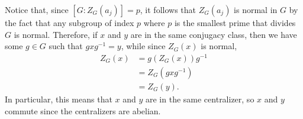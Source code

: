 \documentclass[10pt]{mypackage}
\begin{document}
\begin{solution}
\begin{enumerate}[(a)]
      Notice that, since $\left[ G:Z_G\left( a_j \right) \right] = p$, it follows that $Z_G\left( a_j \right)$ is normal in $G$ by the fact that any subgroup of index $p$ where $p$ is the smallest prime that divides $G$ is normal. Therefore, if $x$ and $y$ are in the same conjugacy class, then we have some $g\in G$ such that $gxg^{-1} = y$, while since $Z_G\left( x \right)$ is normal,
      \begin{align*}
        Z_G\left( x \right) &= g\left( Z_G(x) \right)g^{-1}\\
                            &= Z_G\left( gxg^{-1} \right)\\
                            &= Z_G\left( y \right).
      \end{align*}
      In particular, this means that $x$ and $y$ are in the same centralizer, so $x$ and $y$ commute since the centralizers are abelian.
  \end{enumerate}
\end{solution}
\end{document}
